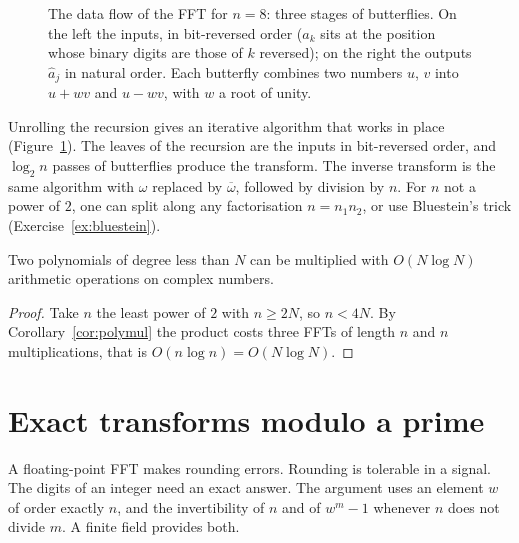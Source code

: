 \begin{figure}[ht]
\centering
{}
\caption{The data flow of the FFT for $n=8$: three stages of butterflies. On the left the inputs, in bit-reversed order
($a_k$ sits at the position whose binary digits are those of $k$ reversed); on the right the outputs $\hat a_j$ in natural
order. Each butterfly combines two numbers $u$, $v$ into $u+wv$ and $u-wv$, with $w$ a root of unity.}
\label{fig:butterfly}
\end{figure}

Unrolling the recursion gives an iterative algorithm that works in place (Figure~\ref{fig:butterfly}). The leaves of the recursion are the inputs in bit-reversed order, and $\log_2 n$ passes of butterflies produce the transform. The inverse transform is the same algorithm with $\omega$ replaced by $\overline\omega$, followed by division by $n$. For $n$ not a power of $2$, one can split along any factorisation $n=n_1n_2$, or use Bluestein's trick (Exercise~\ref{ex:bluestein}).

\begin{corollary}\label{cor:fastmul}
Two polynomials of degree less than $N$ can be multiplied with $O(N\log N)$ arithmetic operations on complex numbers.
\end{corollary}
\begin{proof}
Take $n$ the least power of $2$ with $n\ge2N$, so $n<4N$. By Corollary~\ref{cor:polymul} the product costs three FFTs of length $n$ and $n$ multiplications, that is $O(n\log n)=O(N\log N)$.
\end{proof}

\section{Exact transforms modulo a prime}

A floating-point FFT makes rounding errors. Rounding is tolerable in a signal. The digits of an integer need an exact answer. The argument uses an element $w$ of order exactly $n$, and the invertibility of $n$ and of $w^m-1$ whenever $n$ does not divide $m$. A finite field provides both.


